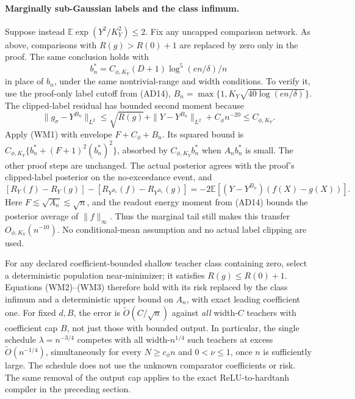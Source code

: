 \paragraph{Marginally sub-Gaussian labels and the class infimum.}
Suppose instead $\mathbb E\exp(Y^2/K_Y^2)\le2$.
Fix any uncapped comparison network. As above, comparisons with
$R(g)>R(0)+1$ are replaced by zero only in the proof.
The same conclusion holds with
\[
 b_n^*=C_{\phi,K_Y}(D+1)\log^5(e n/\delta)/n
\]
in place of $b_n$, under the same nontrivial-range and width conditions.
To verify it, use the proof-only label cutoff from (AD14),
$B_n=\max\{1,K_Y\sqrt{40\log(e n/\delta)}\}$.
The clipped-label residual has bounded second moment because
\[
 \|g_\sigma-Y^{B_n}\|_{L^2}
 \le\sqrt{R(g)}+\|Y-Y^{B_n}\|_{L^2}+C_\phi n^{-20}
 \le C_{\phi,K_Y}.
\]
Apply (WM1) with envelope $F+C_\phi+B_n$. Its squared bound is
$C_{\phi,K_Y}\{b_n^*+(F+1)^2(b_n^*)^2\}$, absorbed by
$C_{\phi,K_Y}b_n^*$ when $A_nb_n^*$ is small.
The other proof steps are unchanged. The actual posterior agrees with
the proof's clipped-label posterior on the no-exceedance event, and
\[
 [R_Y(f)-R_Y(g)]-[R_{Y^{B_n}}(f)-R_{Y^{B_n}}(g)]
 =-2\mathbb E[(Y-Y^{B_n})(f(X)-g(X))].
\]
Here $F\lesssim\sqrt{A_n}\lesssim\sqrt n$, and the readout energy
moment from (AD14) bounds the posterior average of $\|f\|_\infty$.
Thus the marginal tail still makes this transfer $O_{\phi,K_Y}(n^{-10})$.
No conditional-mean assumption and no actual label clipping are used.

For any declared coefficient-bounded shallow teacher class containing
zero, select a deterministic population near-minimizer; it satisfies
$R(g)\le R(0)+1$. Equations (WM2)--(WM3) therefore hold with its
risk replaced by the class infimum and a deterministic upper bound on
$A_n$, with exact leading coefficient one. For fixed $d,B$, the error
is $\widetilde O(C/\sqrt n)$ against \emph{all} width-$C$ teachers
with coefficient cap $B$, not just those with bounded output.
In particular, the single schedule $\lambda=n^{-3/4}$ competes with
all width-$n^{1/4}$ such teachers at excess
$\widetilde O(n^{-1/4})$, simultaneously for every $N\ge c_\phi n$
and $0<\nu\le1$, once $n$ is sufficiently large. The schedule does not
use the unknown comparator coefficients or risk.
The same removal of the output cap applies to the exact ReLU-to-hardtanh
compiler in the preceding section.

